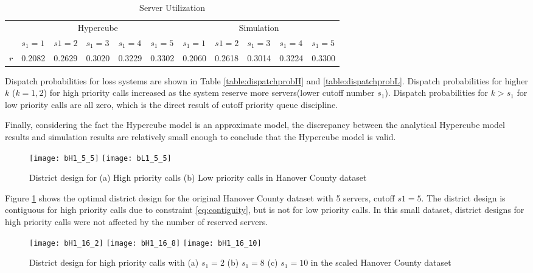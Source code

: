 \documentclass{article}
\begin{document}
\begin{table}
\vspace{10mm}

\centering
\begin{tabular}{| l || l l l l l | l l l l l |}
\hline
& \multicolumn{5}{c|}{Hypercube} & \multicolumn{5}{c|}{Simulation}\\
& $s_1=1$ & $ s1= 2$ & $s_1=3$ & $s_1=4$ & $s_1=5$& $s_1=1$ & $ s1= 2$ & $s_1=3$ & $s_1=4$ & $s_1=5$  \\ 
\hline
$r$   &0.2082&0.2629&0.3020&0.3229&0.3302&0.2060&0.2618&0.3014&0.3224&0.3300  \\
\hline
\end{tabular}
\label{table:queueetc}
\caption{Server Utilization}

\end{table}

Dispatch probabilities for loss systems are shown in Table \ref{table:dispatchprobH} and \ref{table:dispatchprobL}. Dispatch probabilities for higher $k$ ($k=1,2$) for high priority calls increased as the system reserve more servers(lower cutoff number $s_1$). Dispatch probabilities for $k>s_1$ for low priority calls are all zero, which is the direct result of cutoff priority queue discipline.


Finally, considering the fact the Hypercube model is an approximate model, the discrepancy between the analytical Hypercube model results and simulation results are relatively small enough to conclude that the Hypercube model is valid.

\begin{figure}
\texttt{[image: bH1\_5\_5]}
\texttt{[image: bL1\_5\_5]}
\caption{District design for (a) High priority calls (b) Low priority calls in Hanover County dataset}
\label{fig:district}
\end{figure}

Figure \ref{fig:district} shows the optimal district design for the original Hanover County dataset with 5 servers, cutoff $s1=5$. The district design is contiguous for high priority calls due to constraint \ref{eq:contiguity}, but is not for low priority calls. In this small dataset, district designs for high priority calls were not affected by the number of reserved servers.

\begin{figure}
\texttt{[image: bH1\_16\_2]}
\texttt{[image: bH1\_16\_8]}
\texttt{[image: bH1\_16\_10]}
\caption{District design for high priority calls with (a) $s_1=2$ (b) $s_1=8$ (c) $s_1=10$ in the scaled Hanover County dataset}
\label{fig:district_large}
\end{figure}
\end{document}
